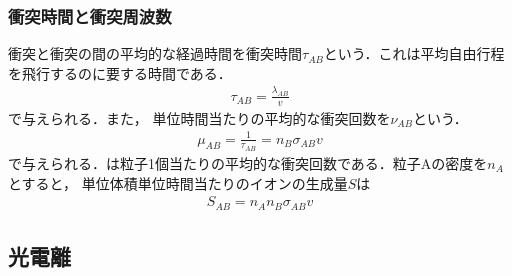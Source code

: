\documentclass{report}
\begin{document}
\subsubsection{衝突時間と衝突周波数}
衝突と衝突の間の平均的な経過時間を衝突時間$\tau_{AB}$という．これは平均自由行程を飛行するのに要する時間である．
\begin{align}
  \tau_{AB} = \frac{\lambda_{AB}}{v} \label{eq:collision_time}
\end{align}
で与えられる．また，
単位時間当たりの平均的な衝突回数を$\nu_{AB}$という．
\begin{align}
  \mu_{AB} = \frac{1}{\tau_{AB}} = n_B \sigma_{AB} v \label{eq:collision_frequency}
\end{align}
で与えられる．は粒子1個当たりの平均的な衝突回数である．粒子Aの密度を$n_A$とすると，
単位体積単位時間当たりのイオンの生成量$S$は
\begin{align}
  S_{AB} = n_A n_B \sigma_{AB} v
\end{align}

\subsection{光電離}
\end{document}
